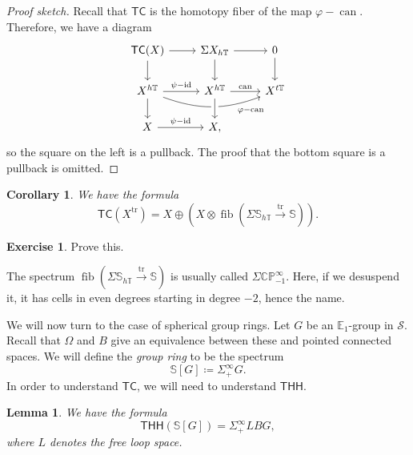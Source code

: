 \documentclass[10pt, oneside]{memoir}
\newtheorem{cor}[thm]{Corollary}
\newtheorem{lem}[thm]{Lemma}
\theoremstyle{definition}
\newtheorem{exer}[thm]{Exercise}
\theoremstyle{remark}
\theoremstyle{plain}
\theoremstyle{definition}
\theoremstyle{remark}
\newcommand{\C}{\mathbb{C}}
\newcommand{\E}{\mathbb{E}}
\newcommand{\bS}{\mathbb{S}}
\renewcommand{\P}{\mathbb{P}}
\newcommand{\mc}[1]{\mathcal{#1}}
\newcommand{\T}{\mathbb{T}}
\newcommand{\on}[1]{\operatorname{#1}}
\newcommand{\ms}[1]{\mathsf{#1}}
\newcommand{\1}{\mathbf{1}}
\newcommand{\2}{\mathbf{2}}
\newcommand{\3}{\mathbf{3}}
\newcommand{\THH}{\ms{THH}}
\newcommand{\TC}{\ms{TC}}
\begin{document}
\begin{proof}[Proof sketch]
    Recall that $\TC$ is the homotopy fiber of the map $\varphi - \on{can}$. Therefore, we have a diagram
    \begin{equation*}
    \begin{tikzcd}
        \TC(X) \ar{d} \ar{r} & \Sigma X_{h\T} \ar{d} \ar{r} & 0 \ar{d} \\
        X^{h\T} \ar{d} \ar{r}{\psi - \on{id}} \ar[bend right=20]{rr}[swap, near end]{\varphi - \on{can}} & X^{h\T} \ar[crossing over]{d} \ar{r}{\on{can}} & X^{t\T} \\
        X \ar{r}{\psi - \on{id}} & X,
    \end{tikzcd}
    \end{equation*}
    so the square on the left is a pullback. The proof that the bottom square is a pullback is omitted.
\end{proof}

\begin{cor}
    We have the formula
    \[ \TC(X^{\on{tr}}) = X \oplus (X \otimes \on{fib}(\Sigma \bS_{h\T} \xrightarrow{\on{tr}} \bS)). \]
\end{cor}

\begin{exer}
    Prove this.
\end{exer}

The spectrum $\on{fib}(\Sigma \bS_{h\T} \xrightarrow{\on{tr}} \bS)$ is usually called $\Sigma \C\P^{\infty}_{-1}$. Here, if we desuspend it, it has cells in even degrees starting in degree $-2$, hence the name.

We will now turn to the case of spherical group rings. Let $G$ be an $\E_1$-group in $\mc{S}$. Recall that $\Omega$ and $B$ give an equivalence between these and pointed connected spaces. We will define the \textit{group ring} to be the spectrum
\[ \bS[G] \coloneqq \Sigma_+^{\infty} G. \]
In order to understand $\TC$, we will need to understand $\THH$.

\begin{lem}
    We have the formula
    \[ \THH(\bS[G]) = \Sigma_+^{\infty} LBG, \]
    where $L$ denotes the free loop space.
\end{lem}
\end{document}
